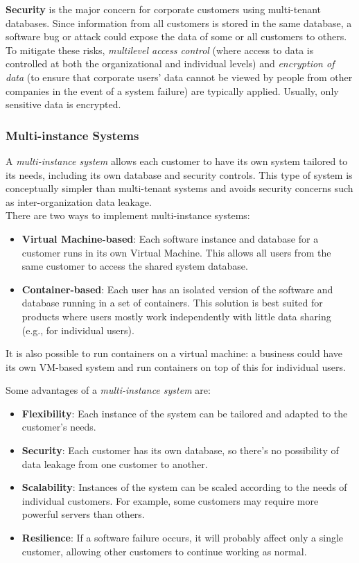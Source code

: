 \textbf{Security} is the major concern for corporate customers using multi-tenant databases. Since information from all customers is stored in the same database, a software bug or attack could expose the data of some or all customers to others. To mitigate these risks, \emph{multilevel access control} (where access to data is controlled at both the organizational and individual levels) and \emph{encryption of data} (to ensure that corporate users' data cannot be viewed by people from other companies in the event of a system failure) are typically applied. Usually, only sensitive data is encrypted.

\subsubsection{Multi-instance Systems}

A \textit{multi-instance system} allows each customer to have its own system tailored to its needs, including its own database and security controls. This type of system is conceptually simpler than multi-tenant systems and avoids security concerns such as inter-organization data leakage.\\

\noindent
There are two ways to implement multi-instance systems:
\begin{itemize}
    \item \textbf{Virtual Machine-based}: Each software instance and database for a customer runs in its own Virtual Machine. This allows all users from the same customer to access the shared system database.
    \item \textbf{Container-based}: Each user has an isolated version of the software and database running in a set of containers. This solution is best suited for products where users mostly work independently with little data sharing (e.g., for individual users).
\end{itemize}
It is also possible to run containers on a virtual machine: a business could have its own VM-based system and run containers on top of this for individual users.

\newpage
\noindent
Some advantages of a \textit{multi-instance system} are:
\begin{itemize}
    \item \textbf{Flexibility}: Each instance of the system can be tailored and adapted to the customer's needs.
    \item \textbf{Security}: Each customer has its own database, so there's no possibility of data leakage from one customer to another.
    \item \textbf{Scalability}: Instances of the system can be scaled according to the needs of individual customers. For example, some customers may require more powerful servers than others.
    \item \textbf{Resilience}: If a software failure occurs, it will probably affect only a single customer, allowing other customers to continue working as normal.
\end{itemize}

